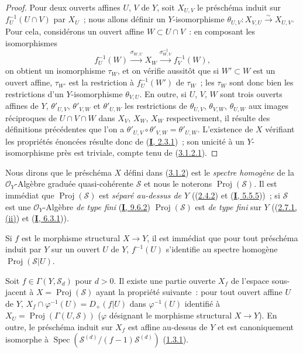 \begin{proof}
Pour deux ouverts affines $U$, $V$ de $Y$, soit $X_{U,V}$ le préschéma
induit sur $f_U^{-1}(U\cap V)$ par $X_U$~; nous allons définir un
$Y$-isomorphisme $\theta_{U,V}:X_{V,U}\xrightarrow{\sim}X_{U,V}$. Pour cela,
considérons un ouvert affine $W\subset U\cap V$~: en composant les
isomorphismes
\[
  f_U^{-1}(W)\xrightarrow{\sigma_{W,U}}X_W
  \xrightarrow{\sigma_{W,V}^{-1}}f_V^{-1}(W),
\]
on obtient un isomorphisme $\tau_W$, et on vérifie aussitôt que si
$W'\subset W$ est un ouvert affine, $\tau_{W'}$ est la restriction à
$f_U^{-1}(W')$ de $\tau_W$~; les $\tau_W$ sont donc bien les restrictions
d'un $Y$-isomorphisme $\theta_{V,U}$. En outre, si $U$, $V$, $W$ sont trois
ouverts affines de $Y$, $\theta'_{U,V}$, $\theta'_{V,W}$ et
$\theta'_{U,W}$ les restrictions de $\theta_{U,V}$, $\theta_{V,W}$,
$\theta_{U,W}$ aux images réciproques de $U\cap V\cap W$ dans $X_V$, $X_W$,
$X_W$ respectivement, il résulte des définitions précédentes que l'on a
$\theta'_{U,V}\circ\theta'_{V,W}=\theta'_{U,W}$. L'existence de $X$
vérifiant les propriétés énoncées résulte donc de
(\hyperref[I.2.3.1-fr]{\textbf{I}, 2.3.1})~; son unicité à un $Y$-isomorphisme près
est triviale, compte tenu de (\hyperref[II.3.1.2.1-fr]{3.1.2.1}).
\end{proof}

\begin{env}[3.1.3]
\label{II.3.1.3-fr}
Nous dirons que le préschéma $X$ défini dans
(\hyperref[II.3.1.2-fr]{3.1.2}) est le \emph{spectre homogène} de la
$\mathcal{O}_Y$-Algèbre graduée quasi-cohérente $\mathcal{S}$ et nous le
noterons $\operatorname{Proj}(\mathcal{S})$. Il est immédiat que
$\operatorname{Proj}(\mathcal{S})$ est \emph{séparé au-dessus de $Y$}
((\hyperref[II.2.4.2-fr]{2.4.2}) et
(\hyperref[I.5.5.5-fr]{\textbf{I}, 5.5.5}))~; si $\mathcal{S}$ est une
$\mathcal{O}_Y$-Algèbre \emph{de type fini}
(\hyperref[I.9.6.2-fr]{\textbf{I}, 9.6.2}) $\operatorname{Proj}(\mathcal{S})$ est
\emph{de type fini} sur $Y$ ((\hyperref[II.2.7.1-fr]{2.7.1, (ii)}) et
(\hyperref[I.6.3.1-fr]{\textbf{I}, 6.3.1})).

Si $f$ est le morphisme structural $X\to Y$, il est immédiat que pour tout
préschéma induit par $Y$ sur un ouvert $U$ de $Y$, $f^{-1}(U)$ s'identifie au
spectre homogène $\operatorname{Proj}(\mathcal{S}|U)$.
\end{env}

\begin{proposition}[3.1.4]
\label{II.3.1.4-fr}
Soit $f\in\Gamma(Y,\mathcal{S}_d)$ pour $d>0$. Il existe une partie ouverte
$X_f$ de l'espace sous-jacent à $X=\operatorname{Proj}(\mathcal{S})$ ayant la
propriété suivante~: pour tout ouvert affine $U$ de $Y$,
$X_f\cap\varphi^{-1}(U)=D_+(f|U)$ dans $\varphi^{-1}(U)$ identifié à
$X_U=\operatorname{Proj}(\Gamma(U,\mathcal{S}))$ ($\varphi$ désignant le
morphisme structural $X\to Y$). En outre, le préschéma induit sur $X_f$ est
affine au-dessus de $Y$ et est canoniquement isomorphe à
$\operatorname{Spec}(\mathcal{S}^{(d)}/(f-1)\mathcal{S}^{(d)})$
\textup{(\hyperref[II.1.3.1-fr]{1.3.1})}.
\end{proposition}


